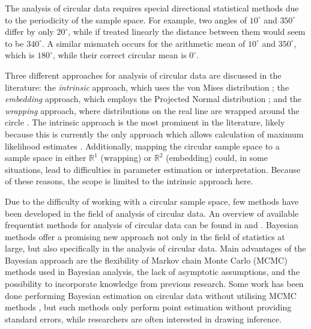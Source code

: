 \documentclass[bib]{ba/ba}
\begin{document}
The analysis of circular data requires special directional statistical methods due to the periodicity of the sample space. For example, two angles of $10^\circ$ and $350^\circ$ differ by only $20^\circ$, while if treated linearly the distance between them would seem to be $340^\circ$. A similar mismatch occurs for the arithmetic mean of $10^\circ$ and $350^\circ$, which is $180^\circ$,  while their correct circular mean is $0^\circ$. 

Three different approaches for analysis of circular data are discussed in the literature: the \textit{intrinsic} approach, which uses the von Mises distribution \citep{von1918ganzzahligkeit, damien1999fullbayes}; the \textit{embedding} approach, which employs the Projected Normal distribution \citep{Nunez-Antonio2005}; and the \textit{wrapping} approach, where distributions on the real line are wrapped around the circle \citep{ferrari2009wrapping}. The intrinsic approach is the most prominent in the literature, likely because this is currently the only approach which allows calculation of maximum likelihood estimates \citep{ferrari2009wrapping}. Additionally, mapping the circular sample space to a sample space in either $\mathbb{R}^1$ (wrapping) or $\mathbb{R}^2$ (embedding) could, in some situations, lead to difficulties in parameter estimation or interpretation. Because of these reasons, the scope is limited to the intrinsic approach here. %

Due to the difficulty of working with a circular sample space, few methods have been developed in the field of analysis of circular data. An overview of available frequentist methods for analysis of circular data can be found in \citet{fisher1995statistical} and \citet{mardia1999directional}. Bayesian methods offer a promising new approach not only in the field of statistics at large, but also specifically in the analysis of circular data. Main advantages of the Bayesian approach are the flexibility of Markov chain Monte Carlo (MCMC) methods used in Bayesian analysis, the lack of asymptotic assumptions, and the possibility to incorporate knowledge from previous research. Some work has been done performing Bayesian estimation on circular data without utilising MCMC methods \citep{dowe1996bayesian}, but such methods only perform point estimation without providing standard errors, while researchers are often interested in drawing inference. 
\end{document}
